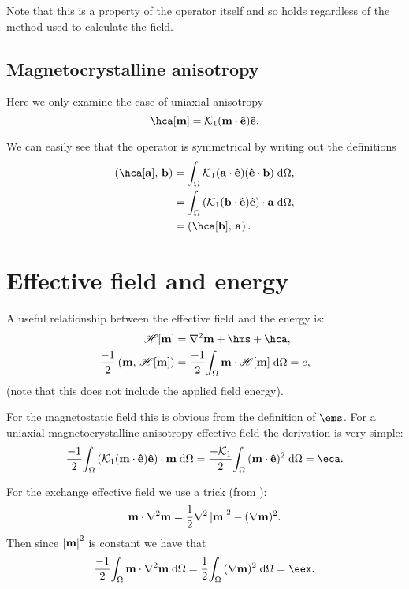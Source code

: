 Note that this is a property of the operator itself and so holds regardless of the method used to calculate the field.


\subsection{Magnetocrystalline anisotropy}

Here we only examine the case of uniaxial anisotropy
\begin{equation}
  \hca[\mv] = \kone (\mv \cdot \ev) \ev.
\end{equation}

We can easily see that the operator is symmetrical by writing out the definitions
\begin{equation}
  \begin{aligned}
    \ip{\hca[\av]}{\bv} &= \intd{ \kone (\av \cdot \ev) (\ev \cdot \bv)}, \\
    &= \intd{(\kone(\bv \cdot \ev) \ev) \cdot \av}, \\
    &= \ip{\hca[\bv]}{\av}.
  \end{aligned}
\end{equation}


\section{Effective field and energy}
\label{sec:energy-field-relation}

A useful relationship between the effective field and the energy is:
\begin{equation}
  \begin{aligned}
    \hop[\mv] &=  \lap \mv + \hms + \hca, \\
    \frac{-1}{2} \ip{\mv}{\hop[\mv]} &= \frac{-1}{2} \intd{\mv \cdot
      \hop[\mv]} = \e,
  \end{aligned}
\end{equation}
(note that this does not include the applied field energy).

For the magnetostatic field this is obvious from the definition of $\ems$.
For a uniaxial magnetocrystalline anisotropy effective field the derivation is very simple:
\begin{equation}
  \frac{-1}{2} \intd{\bigb{\kone (\mv \cdot \ev) \ev} \cdot \mv} =  \frac{-\kone}{2}\intd{(\mv \cdot \ev)^2} = \eca.
\end{equation}

For the exchange effective field we use a trick (from \cite[179]{Aharoni1996}):
\begin{equation}
  \boldsymbol{\mathrm{m}} \cdot \nabla^2 \boldsymbol{\mathrm{m}} = \frac{1}{2} \nabla^2 \left|{\boldsymbol{\mathrm{m}}} \right|^2 - (\nabla \boldsymbol{\mathrm{m}})^2.
\end{equation}
Then since $\left|{\boldsymbol{\mathrm{m}}} \right|^2$ is constant we have that
\begin{equation}
  \frac{-1}{2} \intd{\mv \cdot \lap \mv} = \frac{1}{2} \intd{(\grad \mv)^2} = \eex.
\end{equation}


